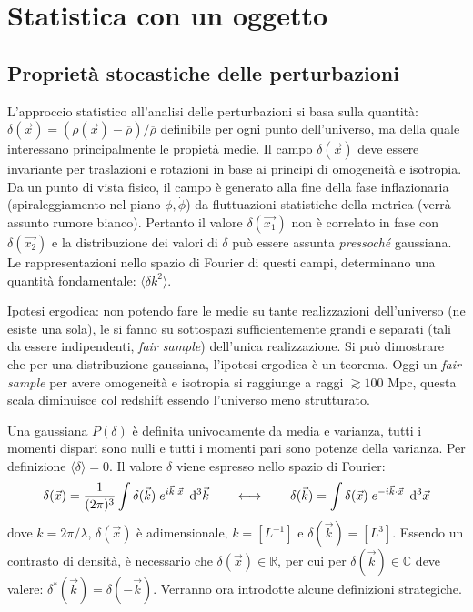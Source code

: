 \chapter{Statistica con un oggetto}\label{8:ch}

\section{Proprietà stocastiche delle perturbazioni}\label{ch8:statistic}
L'approccio statistico all'analisi delle perturbazioni si basa sulla quantità: $\delta (\vec{x}) = \left (\rho(\vec{x})-\overline{\rho} \right)/\overline{\rho}$ definibile per ogni punto dell'universo, ma della quale interessano principalmente le propietà medie. Il campo $\delta (\vec{x})$ deve essere invariante per traslazioni e rotazioni in base ai principi di omogeneità e isotropia. Da un punto di vista fisico, il campo è generato alla fine della fase inflazionaria (spiraleggiamento nel piano $\phi,\dot{\phi}$) da fluttuazioni statistiche della metrica (verrà assunto rumore bianco). Pertanto il valore $\delta (\vec{x_1})$ non è correlato in fase con $\delta (\vec{x_2})$ e la distribuzione dei valori di $\delta$ può essere assunta \textit{pressoché} gaussiana. Le rappresentazioni nello spazio di Fourier di questi campi, determinano una quantità fondamentale: $\langle \delta k^2 \rangle $.

Ipotesi ergodica: non potendo fare le medie su tante realizzazioni dell'universo (ne esiste una sola), le si fanno su sottospazi sufficientemente grandi e separati (tali da essere indipendenti, \textit{fair sample}) dell'unica realizzazione. Si può dimostrare che per una distribuzione gaussiana, l'ipotesi ergodica è un teorema. Oggi un \textit{fair sample} per avere omogeneità e isotropia si raggiunge a raggi $\gtrsim 100$ Mpc, questa scala diminuisce col redshift essendo l'universo meno strutturato. 

Una gaussiana $P(\delta)$ è definita univocamente da media e varianza, tutti i momenti dispari sono nulli e tutti i momenti pari sono potenze della varianza. Per definizione $\langle \delta \rangle =0 $. Il valore $\delta$ viene espresso nello spazio di Fourier:
\begin{equation}
    \delta{(\vec{x})}=\frac{1}{(2\pi)^3}\int \delta{(\vec{k})}\; e^{i\vec{k}\cdot\vec{x}}\; \operatorname{d}\!{^3 \vec{k}} \qquad \longleftrightarrow \qquad \delta{(\vec{k})}=\int \delta{(\vec{x})}\; e^{-i\vec{k}\cdot\vec{x}}\; \operatorname{d}\!{^3 \vec{x}}
\end{equation}
dove $k=2\pi/\lambda$, $\delta{(\vec{x})}$ è adimensionale, $k=[L^{-1}]$ e $\delta{(\vec{k})}=[L^3]$. Essendo un contrasto di densità, è necessario che $\delta{(\vec{x})}\in \mathbb{R} $, per cui per $\delta{(\vec{k})}\in\mathbb{C} $ deve valere: $\delta^*(\vec{k})=\delta{(-\vec{k})}$. Verranno ora introdotte alcune definizioni strategiche.

